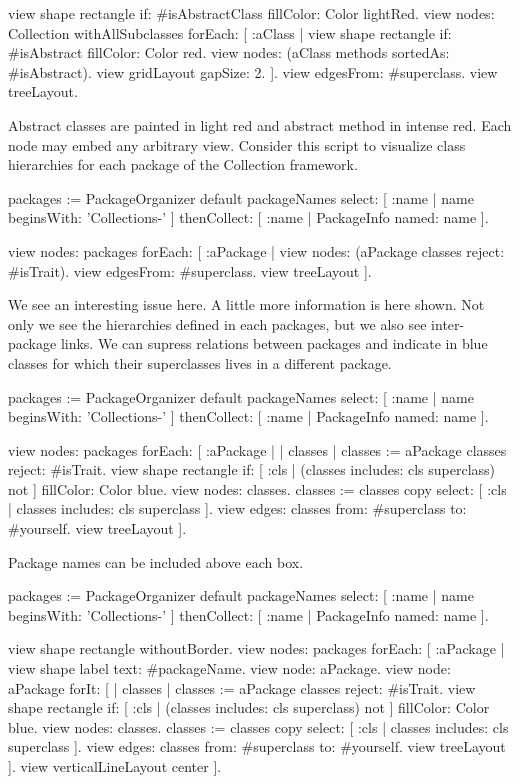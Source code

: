 \documentclass[a4paper,10pt,twoside]{book}
\begin{document}
\begin{code}{}
view shape rectangle
  if: #isAbstractClass fillColor: Color lightRed.
view nodes: Collection withAllSubclasses forEach: [ :aClass | 
  view shape rectangle 
    if: #isAbstract fillColor: Color red.
  view nodes: (aClass methods sortedAs: #isAbstract).
  view gridLayout gapSize: 2. 
].
view edgesFrom: #superclass.
view treeLayout.
\end{code}

Abstract classes are painted in light red and abstract method in intense red. 
Each node may embed any arbitrary view. Consider this script to visualize class hierarchies for each package of the Collection framework.

\begin{code}{}
packages := PackageOrganizer default packageNames
        select: [ :name | name beginsWith: 'Collections-' ] 
        thenCollect:  [ :name | PackageInfo named: name ].
        
view nodes: packages forEach: [ :aPackage | 
  view nodes: (aPackage classes reject: #isTrait).
  view edgesFrom: #superclass.
  view treeLayout
].
\end{code}

We see an interesting issue here. A little more information is here shown. Not only we see the hierarchies defined in each packages, but we also see inter-package links. We can supress relations between packages and indicate in blue classes for which their superclasses lives in a different package.

\begin{code}{}
packages := PackageOrganizer default packageNames
        select: [ :name | name beginsWith: 'Collections-' ] 
        thenCollect:  [ :name | PackageInfo named: name ].
        
view nodes: packages forEach: [ :aPackage | 
  | classes |
  classes := aPackage classes reject: #isTrait.
  view shape rectangle 
    if: [ :cls | (classes includes: cls superclass) not ] fillColor: Color blue.
  view nodes: classes.
  classes := classes copy select: [ :cls | classes includes: cls superclass ].
  view edges: classes from: #superclass to: #yourself.
  view treeLayout
].
\end{code}

Package names can be included above each box.

\begin{code}{}
packages := PackageOrganizer default packageNames
        select: [ :name | name beginsWith: 'Collections-' ] 
        thenCollect:  [ :name | PackageInfo named: name ].

view shape rectangle withoutBorder.
view nodes: packages forEach: [ :aPackage | 
  view shape label text: #packageName.
  view node: aPackage.
  view node: aPackage forIt: [
    | classes |
    classes := aPackage classes reject: #isTrait.
    view shape rectangle 
      if: [ :cls | (classes includes: cls superclass) not ] fillColor: Color blue.
    view nodes: classes.
    classes := classes copy select: [ :cls | classes includes: cls superclass ].
    view edges: classes from: #superclass to: #yourself.
    view treeLayout
  ].
  view verticalLineLayout center
].
\end{code}
\end{document}
